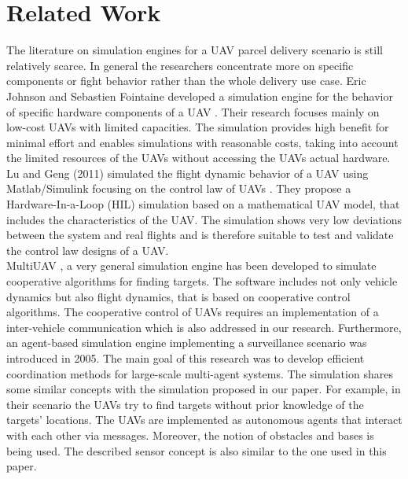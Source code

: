 \section{Related Work}
The literature on simulation engines for a UAV parcel delivery scenario is still relatively scarce. In general the researchers concentrate more on specific components or fight behavior rather than the whole delivery use case. Eric Johnson and Sebastien Fointaine developed a simulation engine for the behavior of specific hardware components of a UAV \cite{johnson.2001}. Their research focuses mainly on low-cost UAVs with limited capacities. The simulation provides high benefit for minimal effort and enables simulations with reasonable costs, taking into account the limited resources of the UAVs without accessing the UAVs actual hardware. Lu and Geng (2011) simulated the flight dynamic behavior of a UAV using Matlab/Simulink focusing on the control law of UAVs \cite{lu.2011}. They propose a Hardware-In-a-Loop (HIL) simulation based on a mathematical UAV model, that includes the characteristics of the UAV. The simulation shows very low deviations between the system and real flights and is therefore suitable to test and validate the control law designs of a UAV. \\
MultiUAV \cite{rasmussen.2003}, a very general simulation engine has been developed to simulate cooperative algorithms for finding targets. The software includes not only vehicle dynamics but also flight dynamics, that is based on cooperative control algorithms. The cooperative control of UAVs requires an implementation of a inter-vehicle communication which is also addressed in our research. Furthermore, an agent-based simulation engine implementing a surveillance scenario was introduced in 2005\cite{jang.2005}. The main goal of this research was to develop efficient coordination methods for large-scale multi-agent systems. The simulation shares some similar concepts with the simulation proposed in our paper. For example, in their scenario the UAVs try to find targets without prior knowledge of the targets’ locations. The UAVs are implemented as autonomous agents that interact with each other via messages. Moreover, the notion of obstacles and bases is being used. The described sensor concept is also similar to the one used in this paper.

